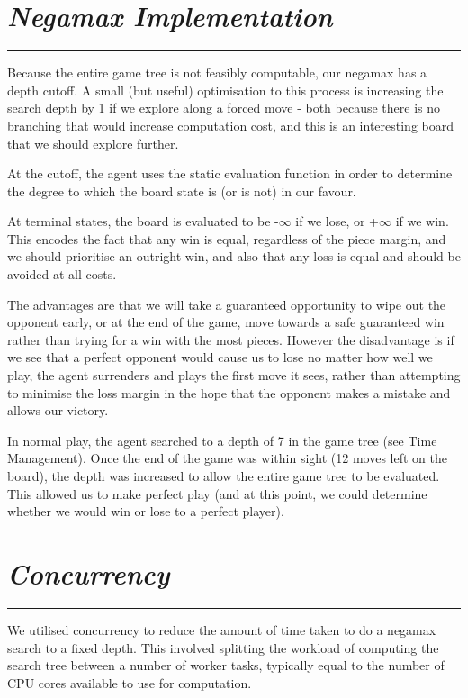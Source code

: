 \documentclass[10pt]{report}
\begin{document}
\begin{multicols}{2}
\section*{\emph{\textmd{Negamax Implementation}}}
\hrule

Because the entire game tree is not feasibly computable, our negamax has a depth cutoff. A small (but useful) optimisation to this process is increasing the search depth by 1 if we explore along a forced move - both because there is no branching that would increase computation cost, and this is an interesting board that we should explore further.

At the cutoff, the agent uses the static evaluation function in order to determine the degree to which the board state is (or is not) in our favour.

At terminal states, the board is evaluated to be -$\infty$ if we lose, or +$\infty$ if we win. This encodes the fact that any win is equal, regardless of the piece margin, and we should prioritise an outright win, and also that any loss is equal and should be avoided at all costs.

The advantages are that we will take a guaranteed opportunity to wipe out the opponent early, or at the end of the game, move towards a safe guaranteed win rather than trying for a win with the most pieces. However the disadvantage is if we see that a perfect opponent would cause us to lose no matter how well we play, the agent surrenders and plays the first move it sees, rather than attempting to minimise the loss margin in the hope that the opponent makes a mistake and allows our victory.

In normal play, the agent searched to a depth of 7 in the game tree (see Time Management). Once the end of the game was within sight (12 moves left on the board), the depth was increased to allow the entire game tree to be evaluated. This allowed us to make perfect play (and at this point, we could determine whether we would win or lose to a perfect player).
\section*{\emph{Concurrency}}
\hrule

We utilised concurrency to reduce the amount of time taken to do a negamax search to a fixed depth. This involved splitting the workload of computing the search tree between a number of worker tasks, typically equal to the number of CPU cores available to use for computation.


\end{multicols}
\end{document}
